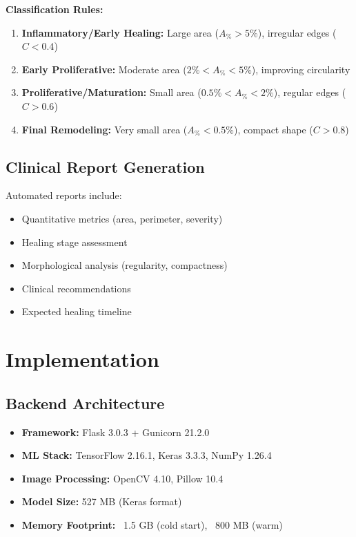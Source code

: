 \documentclass[conference]{IEEEtran}
\begin{document}
\textbf{Classification Rules:}
\begin{enumerate}
    \item \textbf{Inflammatory/Early Healing:} Large area ($A_{\%} > 5\%$), irregular edges ($C < 0.4$)
    \item \textbf{Early Proliferative:} Moderate area ($2\% < A_{\%} < 5\%$), improving circularity
    \item \textbf{Proliferative/Maturation:} Small area ($0.5\% < A_{\%} < 2\%$), regular edges ($C > 0.6$)
    \item \textbf{Final Remodeling:} Very small area ($A_{\%} < 0.5\%$), compact shape ($C > 0.8$)
\end{enumerate}

\subsection{Clinical Report Generation}
Automated reports include:
\begin{itemize}
    \item Quantitative metrics (area, perimeter, severity)
    \item Healing stage assessment
    \item Morphological analysis (regularity, compactness)
    \item Clinical recommendations
    \item Expected healing timeline
\end{itemize}

\section{Implementation}

\subsection{Backend Architecture}
\begin{itemize}
    \item \textbf{Framework:} Flask 3.0.3 + Gunicorn 21.2.0
    \item \textbf{ML Stack:} TensorFlow 2.16.1, Keras 3.3.3, NumPy 1.26.4
    \item \textbf{Image Processing:} OpenCV 4.10, Pillow 10.4
    \item \textbf{Model Size:} 527 MB (Keras format)
    \item \textbf{Memory Footprint:} ~1.5 GB (cold start), ~800 MB (warm)
\end{itemize}
\end{document}
